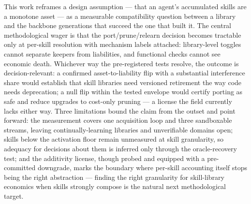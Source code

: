 \documentclass[11pt]{article}
\begin{document}
This work reframes a design assumption --- that an agent's accumulated skills are a monotone asset --- as a measurable compatibility question between a library and the backbone generations that succeed the one that built it. The central methodological wager is that the port/prune/relearn decision becomes tractable only at per-skill resolution with mechanism labels attached: library-level toggles cannot separate keepers from liabilities, and functional checks cannot see economic death. Whichever way the pre-registered tests resolve, the outcome is decision-relevant: a confirmed asset-to-liability flip with a substantial interference share would establish that skill libraries need versioned retirement the way code needs deprecation; a null flip within the tested envelope would certify porting as safe and reduce upgrades to cost-only pruning --- a license the field currently lacks either way. Three limitations bound the claim from the outset and point forward: the measurement covers one acquisition loop and three sandboxable streams, leaving continually-learning libraries and unverifiable domains open; skills below the activation floor remain unmeasured at skill granularity, so adequacy for decisions about them is inferred only through the oracle-recovery test; and the additivity license, though probed and equipped with a pre-committed downgrade, marks the boundary where per-skill accounting itself stops being the right abstraction --- finding the right granularity for skill-library economics when skills strongly compose is the natural next methodological target.



\end{document}
